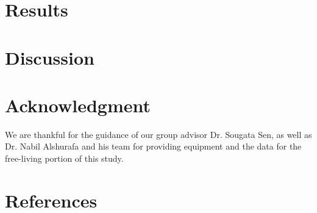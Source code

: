 \documentclass[conference]{IEEEtran}
\begin{document}
\section{Results}

\section{Discussion}

\section*{Acknowledgment}
We are thankful for the guidance of our group advisor Dr. Sougata Sen, as well as Dr. Nabil Alshurafa and his team for providing equipment and the data for the free-living portion of this study.

\section*{References}



\end{document}
